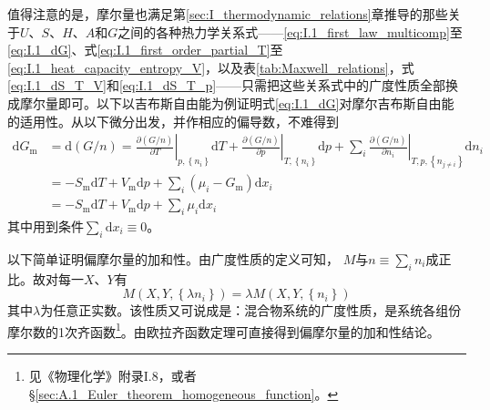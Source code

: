 \documentclass[main.tex]{subfiles}
\begin{document}
值得注意的是，摩尔量也满足第\ref{sec:I_thermodynamic_relations}章推导的那些关于$U$、$S$、$H$、$A$和$G$之间的各种热力学关系式——\eqref{eq:I.1_first_law_multicomp}至\eqref{eq:I.1_dG}、式\eqref{eq:I.1_first_order_partial_T}至\eqref{eq:I.1_heat_capacity_entropy_V}，以及表\ref{tab:Maxwell_relations}，式\eqref{eq:I.1_dS_T_V}和\eqref{eq:I.1_dS_T_p}——只需把这些关系式中的广度性质全部换成摩尔量即可。以下以吉布斯自由能为例证明式\eqref{eq:I.1_dG}对摩尔吉布斯自由能的适用性。从以下微分出发，并作相应的偏导数，不难得到
\begin{align*}
  \mathrm{d}G_\text{m} & =\mathrm{d}\left(G/n\right)=\left.\frac{\partial\left(G/n\right)}{\partial T}\right|_{p,\left\{n_i\right\}}\mathrm{d}T+\left.\frac{\partial\left(G/n\right)}{\partial p}\right|_{T,\left\{n_i\right\}}\mathrm{d}p+\sum_i\left.\frac{\partial\left(G/n\right)}{\partial n_i}\right|_{T,p,\left\{n_{j\neq i}\right\}}\mathrm{d}n_i \\
                       & =-S_\text{m}\mathrm{d}T+V_\text{m}\mathrm{d}p+\sum_i\left(\mu_i-G_\text{m}\right)\mathrm{d}x_i                                                                                                                                                                                                                                   \\
                       & =-S_\text{m}\mathrm{d}T+V_\text{m}\mathrm{d}p+\sum_i\mu_i\mathrm{d}x_i
\end{align*}
其中用到条件$\sum_i\mathrm{d}x_i\equiv 0$。

以下简单证明偏摩尔量的加和性。由广度性质的定义可知， $M$与$n\equiv\sum_in_i$成正比。故对每一$X$、$Y$有
\[M\left(X,Y,\left\{\lambda n_i\right\}\right)=\lambda M\left(X,Y,\left\{n_i\right\}\right)\]
其中$\lambda$为任意正实数。该性质又可说成是：混合物系统的广度性质，是系统各组份摩尔数的1次齐函数\footnote{见《物理化学》附录I.8，或者\S\ref{sec:A.1_Euler_theorem_homogeneous_function}。}。由欧拉齐函数定理可直接得到偏摩尔量的加和性结论。
\end{document}
